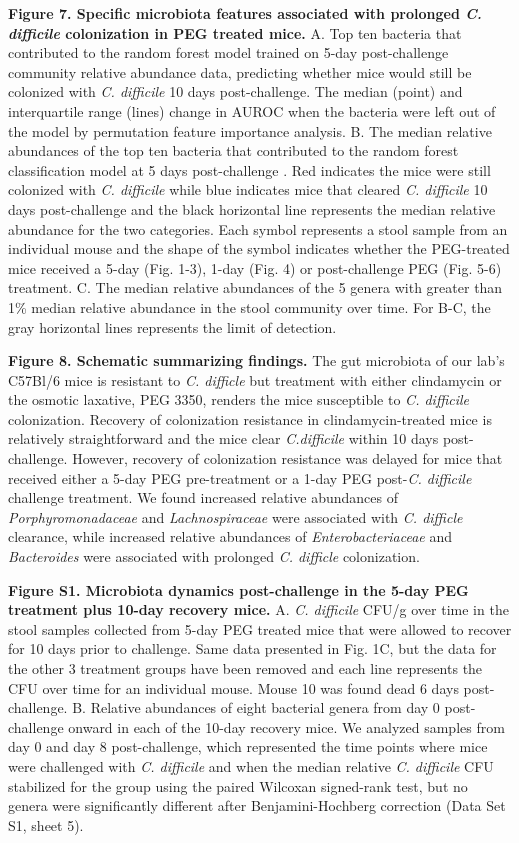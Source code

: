 \documentclass[
  11pt,
]{article}
\begin{document}
\newpage

\textbf{Figure 7. Specific microbiota features associated with prolonged
\emph{C. difficile} colonization in PEG treated mice.} A. Top ten
bacteria that contributed to the random forest model trained on 5-day
post-challenge community relative abundance data, predicting whether
mice would still be colonized with \emph{C. difficile} 10 days
post-challenge. The median (point) and interquartile range (lines)
change in AUROC when the bacteria were left out of the model by
permutation feature importance analysis. B. The median relative
abundances of the top ten bacteria that contributed to the random forest
classification model at 5 days post-challenge . Red indicates the mice
were still colonized with \emph{C. difficile} while blue indicates mice
that cleared \emph{C. difficile} 10 days post-challenge and the black
horizontal line represents the median relative abundance for the two
categories. Each symbol represents a stool sample from an individual
mouse and the shape of the symbol indicates whether the PEG-treated mice
received a 5-day (Fig. 1-3), 1-day (Fig. 4) or post-challenge PEG (Fig.
5-6) treatment. C. The median relative abundances of the 5 genera with
greater than 1\% median relative abundance in the stool community over
time. For B-C, the gray horizontal lines represents the limit of
detection. \newpage

\textbf{Figure 8. Schematic summarizing findings.} The gut microbiota of
our lab's C57Bl/6 mice is resistant to \emph{C. difficle} but treatment
with either clindamycin or the osmotic laxative, PEG 3350, renders the
mice susceptible to \emph{C. difficile} colonization. Recovery of
colonization resistance in clindamycin-treated mice is relatively
straightforward and the mice clear \emph{C.difficile} within 10 days
post-challenge. However, recovery of colonization resistance was delayed
for mice that received either a 5-day PEG pre-treatment or a 1-day PEG
post-\emph{C. difficile} challenge treatment. We found increased
relative abundances of \emph{Porphyromonadaceae} and
\emph{Lachnospiraceae} were associated with \emph{C. difficle}
clearance, while increased relative abundances of
\emph{Enterobacteriaceae} and \emph{Bacteroides} were associated with
prolonged \emph{C. difficle} colonization. \newpage

\textbf{Figure S1. Microbiota dynamics post-challenge in the 5-day PEG
treatment plus 10-day recovery mice.} A. \emph{C. difficile} CFU/g over
time in the stool samples collected from 5-day PEG treated mice that
were allowed to recover for 10 days prior to challenge. Same data
presented in Fig. 1C, but the data for the other 3 treatment groups have
been removed and each line represents the CFU over time for an
individual mouse. Mouse 10 was found dead 6 days post-challenge. B.
Relative abundances of eight bacterial genera from day 0 post-challenge
onward in each of the 10-day recovery mice. We analyzed samples from day
0 and day 8 post-challenge, which represented the time points where mice
were challenged with \emph{C. difficile} and when the median relative
\emph{C. difficile} CFU stabilized for the group using the paired
Wilcoxan signed-rank test, but no genera were significantly different
after Benjamini-Hochberg correction (Data Set S1, sheet 5). \newpage
\end{document}
